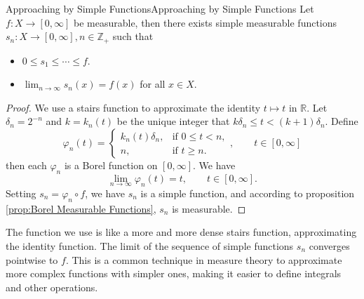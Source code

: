 \documentclass[../main.tex]{subfiles}
\begin{document}
\begin{theorem}{Approaching by Simple Functions}{Approaching by Simple Functions}
	Let $f:X \rightarrow [0,\infty ]$ be measurable, then there exists simple measurable functions $s_n: X \rightarrow [0,\infty ],n\in \mathbb{Z}_+$ such that
	\begin{itemize}
	\item $0\leq s_1\leq \cdots \leq f$.
	\item $\lim_{n\rightarrow \infty } s_n(x) = f(x)$ for all $x\in X$.
	\end{itemize}
\end{theorem}
\begin{proof}
	We use a stairs function to approximate the identity $t \mapsto t$ in $\mathbb{R}$. Let $\delta_n = 2^{-n}$ and $k = k_n(t)$ be the unique integer that $k \delta_n \leq t< (k+1) \delta_n$. Define
	\begin{equation*}
		\varphi_n(t) =
		\begin{cases}
			k_n(t) \delta_n, & \text{if } 0\leq t<n, \\
			n, & \text{if } t\geq n.
		\end{cases}, \qquad t\in [0, \infty ]
	\end{equation*}
then each $\varphi_n$ is a Borel function on $[0,\infty ]$. We have
\begin{equation*}
	\lim_{n \to \infty } \varphi_n(t) = t, \qquad t\in [0,\infty ].
\end{equation*}
Setting $s_n = \varphi_n \circ f$, we have $s_n$ is a simple function, and according to proposition \ref{prop:Borel Measurable Functions}, $s_n$ is measurable.
\end{proof}

\begin{remark}
The function we use is like a more and more dense stairs function, approximating the identity function. The limit of the sequence of simple functions $s_n$ converges pointwise to $f$. This is a common technique in measure theory to approximate more complex functions with simpler ones, making it easier to define integrals and other operations.
\end{remark}
\end{document}
